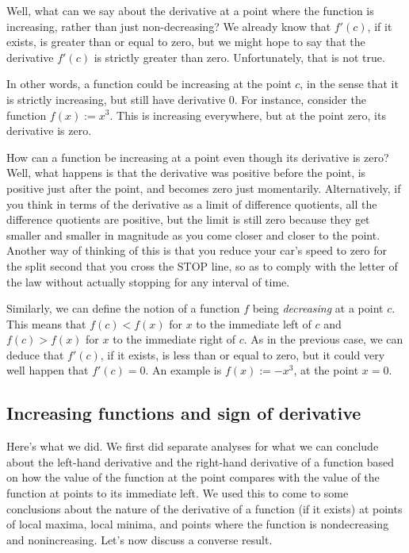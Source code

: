 \documentclass[10pt]{amsart}
\begin{document}
Well, what can we say about the derivative at a point where the
function is increasing, rather than just non-decreasing? We already
know that $f'(c)$, if it exists, is greater than or equal to zero, but
we might hope to say that the derivative $f'(c)$ is strictly greater
than zero. Unfortunately, that is not true.

In other words, a function could be increasing at the point $c$, in
the sense that it is strictly increasing, but still have derivative
$0$. For instance, consider the function $f(x) := x^3$. This is
increasing everywhere, but at the point zero, its derivative is zero.

How can a function be increasing at a point even though its derivative
is zero? Well, what happens is that the derivative was positive before
the point, is positive just after the point, and becomes zero just
momentarily. Alternatively, if you think in terms of the derivative as
a limit of difference quotients, all the difference quotients are
positive, but the limit is still zero because they get smaller and
smaller in magnitude as you come closer and closer to the
point. Another way of thinking of this is that you reduce your car's
speed to zero for the split second that you cross the STOP line, so as
to comply with the letter of the law without actually stopping for any
interval of time.

Similarly, we can define the notion of a function $f$ being {\em
decreasing} at a point $c$. This means that $f(c) < f(x)$ for $x$ to
the immediate left of $c$ and $f(c) > f(x)$ for $x$ to the immediate
right of $c$. As in the previous case, we can deduce that $f'(c)$, if
it exists, is less than or equal to zero, but it could very well
happen that $f'(c) = 0$. An example is $f(x) := -x^3$, at the point $x
= 0$.

\subsection{Increasing functions and sign of derivative}

Here's what we did. We first did separate analyses for what we can
conclude about the left-hand derivative and the right-hand derivative
of a function based on how the value of the function at the point
compares with the value of the function at points to its immediate
left. We used this to come to some conclusions about the nature of the
derivative of a function (if it exists) at points of local maxima,
local minima, and points where the function is nondecreasing and
nonincreasing. Let's now discuss a converse result.
\end{document}
